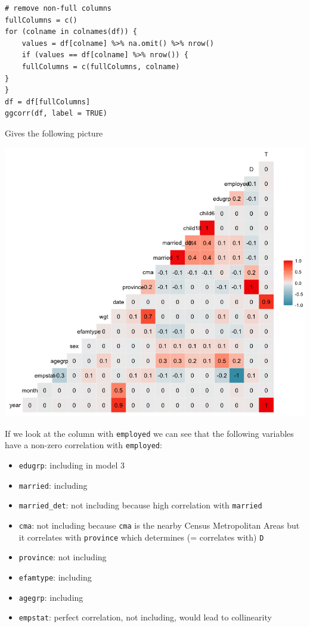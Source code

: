 \documentclass{article}
\begin{document}
\begin{enumerate}[label=(\alph*)]
\begin{lstlisting}[tabsize=2]
# remove non-full columns
fullColumns = c()
for (colname in colnames(df)) {
	values = df[colname] %>% na.omit() %>% nrow()
	if (values == df[colname] %>% nrow()) {
	fullColumns = c(fullColumns, colname)
}
}
df = df[fullColumns]
ggcorr(df, label = TRUE)
		\end{lstlisting}
		Gives the following picture
		\begin{center}
			\includegraphics[scale=0.4]{corr}
		\end{center}
		If we look at the column with \texttt{employed} we can see that the following variables have a non-zero correlation with \texttt{employed}:
		\begin{itemize}
			\item \texttt{edugrp}: including in model 3
			\item \texttt{married}: including
			\item \texttt{married\_det}: not including because high correlation with \texttt{married}
			\item \texttt{cma}: not including because \texttt{cma} is the nearby Census Metropolitan Areas but it correlates with \texttt{province} which determines (= correlates with) \texttt{D}
			\item \texttt{province}: not including
			\item \texttt{efamtype}: including
			\item \texttt{agegrp}: including
			\item \texttt{empstat}: perfect correlation, not including, would lead to collinearity

\end{itemize}
\end{enumerate}
\end{document}
